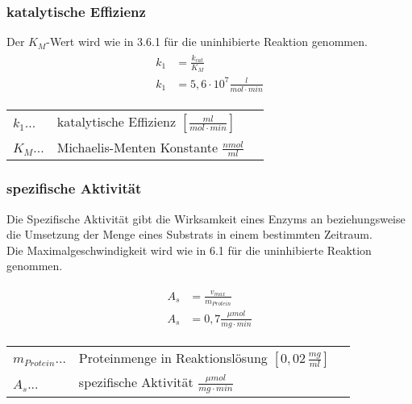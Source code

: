 \subsubsection{katalytische Effizienz}

Der $K_M$-Wert wird wie in 3.6.1 für die uninhibierte Reaktion genommen.
\begin{align}
  \begin{split}
    k_1 &= \frac{k_{cat}}{K_M} \\
    k_1 &= 5,6 \cdot 10^7 \frac{l}{mol \cdot min}
  \end{split}
\end{align}

\begin{table}[H]
  \begin{tabular}{lll}
    $k_{1}$...& katalytische Effizienz $[\frac{ml}{mol \cdot min}]$ & \\
    $K_M$... & Michaelis-Menten Konstante $\frac{nmol}{ml}$ \\
  \end{tabular}
\end{table}

\subsubsection{spezifische Aktivität}
Die Spezifische Aktivität gibt die Wirksamkeit eines Enzyms an beziehungsweise die Umsetzung der Menge eines Substrats in einem bestimmten Zeitraum. \\
Die Maximalgeschwindigkeit wird wie in 6.1 für die uninhibierte Reaktion genommen. 

\begin{align}
  \begin{split} 
    A_s &= \frac{v_{max}}{m_{Protein}} \\
    A_s &= 0,7 \frac{\mu mol}{mg \cdot min}
  \end{split}
\end{align}

\begin{table}[H]
  \begin{tabular}{lll}
    $m_{Protein}$...& Proteinmenge in Reaktionslösung $[0,02 \, \frac{mg}{ml}]$ & \\
    $A_s$... & spezifische Aktivität $\frac{\mu mol}{mg \cdot min}$ \\
  \end{tabular}
\end{table}
